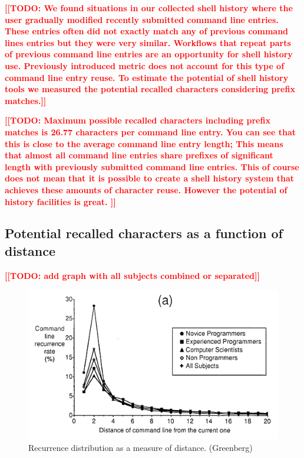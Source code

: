 \documentclass[thesis=M,english]{FITthesis}[2012/10/20]
\newcommand{\blind}[1][1]{}
\newcommand{\todotext}[1]{\textcolor{red}{\textbf{[[#1]]}}}
\newcommand{\tmpframe}[1]{\fbox{#1}}
\renewcommand{\tmpframe}[1]{#1}
\begin{document}
\todotext{TODO: We found situations in our collected shell history where the user gradually modified recently submitted command line entries. These entries often did not exactly match any of previous command lines entries but they were very similar. Workflows that repeat parts of previous command line entries are an opportunity for shell history use. Previously introduced metric does not account for this type of command line entry reuse. To estimate the potential of shell history tools we measured the potential recalled characters considering prefix matches.}

\todotext{TODO: Maximum possible recalled characters including prefix matches is 26.77 characters per command line entry. You can see that this is close to the average command line entry length; This means that almost all command line entries share prefixes of significant length with previously submitted command line entries. This of course does not mean that it is possible to create a shell history system that achieves these amounts of character reuse. However the potential of history facilities is great. }







\blind

\subsection{Potential recalled characters as a function of distance}

\todotext{TODO: add graph with all subjects combined or separated}

\begin{figure}
\centering
  \tmpframe{\includegraphics[width=\linewidth]{figures/greenberg/plot_ref_cmdline-recurr-rate.png}}
  \caption{Recurrence distribution as a measure of distance. (Greenberg)}
\end{figure}
\end{document}
